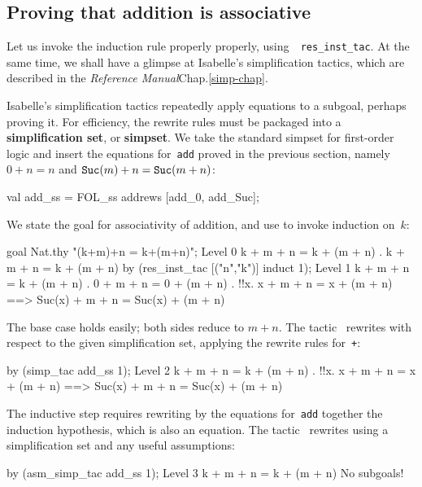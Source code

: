 \subsection{Proving that addition is associative}
Let us invoke the induction rule properly properly, using~{\tt
  res_inst_tac}.  At the same time, we shall have a glimpse at Isabelle's
simplification tactics, which are described in 
%
    {the {\em Reference Manual}}{Chap.\ts\ref{simp-chap}}.


Isabelle's simplification tactics repeatedly apply equations to a subgoal,
perhaps proving it.  For efficiency, the rewrite rules must be
packaged into a {\bf simplification set}, 
or {\bf simpset}.  We take the standard simpset for first-order logic and
insert the equations for~{\tt add} proved in the previous section, namely
$0+n=n$ and ${\tt Suc}(m)+n={\tt Suc}(m+n)$:
\begin{ttbox}
val add_ss = FOL_ss addrews [add_0, add_Suc];
\end{ttbox}
We state the goal for associativity of addition, and
use  to invoke induction on~$k$:
\begin{ttbox}
goal Nat.thy "(k+m)+n = k+(m+n)";
{\out Level 0}
{\out k + m + n = k + (m + n)}
{. k + m + n = k + (m + n)}
\ttbreak
by (res_inst_tac [("n","k")] induct 1);
{\out Level 1}
{\out k + m + n = k + (m + n)}
{. 0 + m + n = 0 + (m + n)}
{. !!x. x + m + n = x + (m + n) ==>}
{\out          Suc(x) + m + n = Suc(x) + (m + n)}
\end{ttbox}
The base case holds easily; both sides reduce to $m+n$.  The
tactic~ rewrites with respect to the given simplification
set, applying the rewrite rules for~{\tt +}:
\begin{ttbox}
by (simp_tac add_ss 1);
{\out Level 2}
{\out k + m + n = k + (m + n)}
{. !!x. x + m + n = x + (m + n) ==>}
{\out          Suc(x) + m + n = Suc(x) + (m + n)}
\end{ttbox}
The inductive step requires rewriting by the equations for~{\tt add}
together the induction hypothesis, which is also an equation.  The
tactic~ rewrites using a simplification set and any
useful assumptions:
\begin{ttbox}
by (asm_simp_tac add_ss 1);
{\out Level 3}
{\out k + m + n = k + (m + n)}
{\out No subgoals!}
\end{ttbox}


